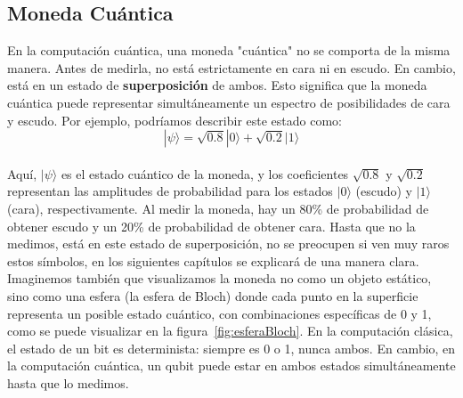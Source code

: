 \subsection*{Moneda Cuántica}
\noindent
En la computación cuántica, una moneda "cuántica" no se comporta de la misma manera. Antes de medirla, no está estrictamente en cara ni en escudo. En cambio, está en un estado de \textbf{superposición} de ambos. Esto significa que la moneda cuántica puede representar simultáneamente un espectro de posibilidades de cara y escudo. Por ejemplo, podríamos describir este estado como:\\[0.5em]

\[
|\psi\rangle = \sqrt{0.8}|0\rangle + \sqrt{0.2}|1\rangle
\] \\[0.5em]

\noindent
Aquí, \( |\psi\rangle \) es el estado cuántico de la moneda, y los coeficientes \( \sqrt{0.8} \) y \( \sqrt{0.2} \) representan las amplitudes de probabilidad para los estados \( |0\rangle \) (escudo) y \( |1\rangle \) (cara), respectivamente. Al medir la moneda, hay un 80\% de probabilidad de obtener escudo y un 20\% de probabilidad de obtener cara.
Hasta que no la medimos, está en este estado de superposición, no se preocupen si ven muy raros estos símbolos, en los siguientes capítulos se explicará de una manera clara.\\[0.5em]
\noindent
Imaginemos también que visualizamos la moneda no como un objeto estático, sino como una esfera (la esfera de Bloch) donde cada punto en la superficie representa un posible estado cuántico, con combinaciones específicas de 0 y 1, como se puede visualizar en la figura~\ref{fig:esferaBloch}. En la computación clásica, el estado de un bit es determinista: siempre es 0 o 1, nunca ambos. En cambio, en la computación cuántica, un qubit puede estar en ambos estados simultáneamente hasta que lo medimos.\\[0.5em]
